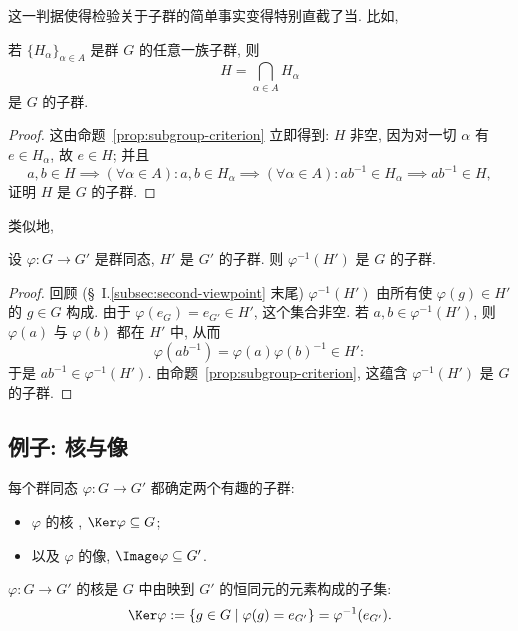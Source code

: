这一判据使得检验关于子群的简单事实变得特别直截了当. 比如,

\begin{lemma}
\label{lem:intersection-subgroup}
若 $\{H_{\alpha}\}_{\alpha \in A}$ 是群 $G$ 的任意一族子群, 则
\[
H = \bigcap_{\alpha \in A} H_{\alpha}
\]
是 $G$ 的子群.
\end{lemma}

\begin{proof}
这由命题~\ref{prop:subgroup-criterion} 立即得到: $H$ 非空, 因为对一切 $\alpha$ 有 $e \in H_{\alpha}$, 故 $e \in H$; 并且
\[
a, b \in H \implies (\forall \alpha \in A): a, b \in H_{\alpha} \implies (\forall \alpha \in A): ab^{-1} \in H_{\alpha} \implies ab^{-1} \in H,
\]
证明 $H$ 是 $G$ 的子群.
\end{proof}

类似地,

\begin{lemma}
\label{lem:preimage-subgroup}
设 $\varphi : G \to G'$ 是群同态, $H'$ 是 $G'$ 的子群. 则 $\varphi^{-1}(H')$ 是 $G$ 的子群.
\end{lemma}

\begin{proof}
回顾 (\S~I.\ref{subsec:second-viewpoint} 末尾) $\varphi^{-1}(H')$ 由所有使 $\varphi(g) \in H'$ 的 $g \in G$ 构成. 由于 $\varphi(e_G) = e_{G'} \in H'$, 这个集合非空. 若 $a, b \in \varphi^{-1}(H')$, 则 $\varphi(a)$ 与 $\varphi(b)$ 都在 $H'$ 中, 从而
\[
\varphi(ab^{-1}) = \varphi(a)\varphi(b)^{-1} \in H':
\]
于是 $ab^{-1} \in \varphi^{-1}(H')$. 由命题~\ref{prop:subgroup-criterion}, 这蕴含 $\varphi^{-1}(H')$ 是 $G$ 的子群.
\end{proof}

\subsection{例子: 核与像}
\label{subsec:kernel-image}

每个群同态 $\varphi : G \to G'$ 都确定两个有趣的子群:
\begin{itemize}
	\item $\varphi$ 的核%
, $\Ker \varphi \subseteq G$;
	\item 以及 $\varphi$ 的像, $\Image \varphi \subseteq G'$.
\end{itemize}

\begin{definition}
\label{def:kernel}
$\varphi : G \to G'$ 的核是 $G$ 中由映到 $G'$ 的恒同元的元素构成的子集:
\[
\Ker \varphi := \{g \in G \mid \varphi(g) = e_{G'}\} = \varphi^{-1}(e_{G'}).
\]
\end{definition}

